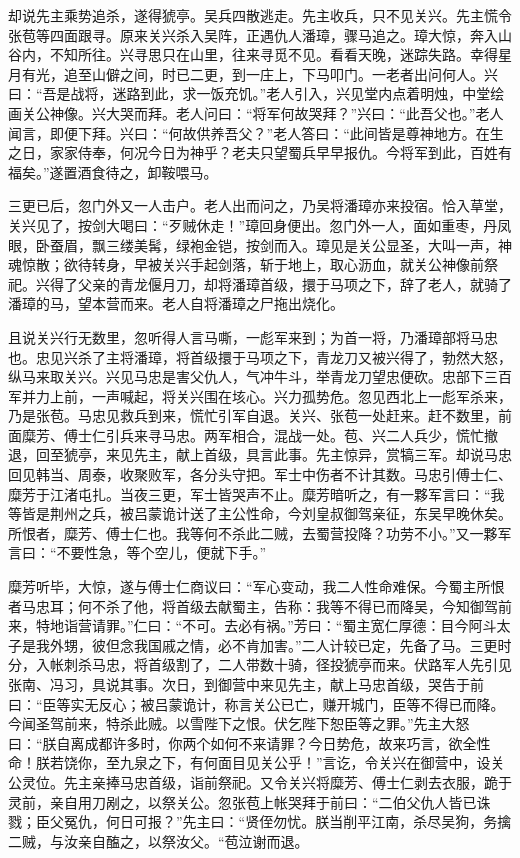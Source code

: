 却说先主乘势追杀，遂得猇亭。吴兵四散逃走。先主收兵，只不见关兴。先主慌令张苞等四面跟寻。原来关兴杀入吴阵，正遇仇人潘璋，骤马追之。璋大惊，奔入山谷内，不知所往。兴寻思只在山里，往来寻觅不见。看看天晚，迷踪失路。幸得星月有光，追至山僻之间，时已二更，到一庄上，下马叩门。一老者出问何人。兴曰：“吾是战将，迷路到此，求一饭充饥。”老人引入，兴见堂内点着明烛，中堂绘画关公神像。兴大哭而拜。老人问曰：“将军何故哭拜？”兴曰：“此吾父也。”老人闻言，即便下拜。兴曰：“何故供养吾父？”老人答曰：“此间皆是尊神地方。在生之日，家家侍奉，何况今日为神乎？老夫只望蜀兵早早报仇。今将军到此，百姓有福矣。”遂置酒食待之，卸鞍喂马。

三更已后，忽门外又一人击户。老人出而问之，乃吴将潘璋亦来投宿。恰入草堂，关兴见了，按剑大喝曰：“歹贼休走！”璋回身便出。忽门外一人，面如重枣，丹凤眼，卧蚕眉，飘三缕美髯，绿袍金铠，按剑而入。璋见是关公显圣，大叫一声，神魂惊散；欲待转身，早被关兴手起剑落，斩于地上，取心沥血，就关公神像前祭祀。兴得了父亲的青龙偃月刀，却将潘璋首级，擐于马项之下，辞了老人，就骑了潘璋的马，望本营而来。老人自将潘璋之尸拖出烧化。

且说关兴行无数里，忽听得人言马嘶，一彪军来到；为首一将，乃潘璋部将马忠也。忠见兴杀了主将潘璋，将首级擐于马项之下，青龙刀又被兴得了，勃然大怒，纵马来取关兴。兴见马忠是害父仇人，气冲牛斗，举青龙刀望忠便砍。忠部下三百军并力上前，一声喊起，将关兴围在垓心。兴力孤势危。忽见西北上一彪军杀来，乃是张苞。马忠见救兵到来，慌忙引军自退。关兴、张苞一处赶来。赶不数里，前面糜芳、傅士仁引兵来寻马忠。两军相合，混战一处。苞、兴二人兵少，慌忙撤退，回至猇亭，来见先主，献上首级，具言此事。先主惊异，赏犒三军。却说马忠回见韩当、周泰，收聚败军，各分头守把。军士中伤者不计其数。马忠引傅士仁、糜芳于江渚屯扎。当夜三更，军士皆哭声不止。糜芳暗听之，有一夥军言曰：“我等皆是荆州之兵，被吕蒙诡计送了主公性命，今刘皇叔御驾亲征，东吴早晚休矣。所恨者，糜芳、傅士仁也。我等何不杀此二贼，去蜀营投降？功劳不小。”又一夥军言曰：“不要性急，等个空儿，便就下手。”

糜芳听毕，大惊，遂与傅士仁商议曰：“军心变动，我二人性命难保。今蜀主所恨者马忠耳；何不杀了他，将首级去献蜀主，告称：我等不得已而降吴，今知御驾前来，特地诣营请罪。”仁曰：“不可。去必有祸。”芳曰：“蜀主宽仁厚德：目今阿斗太子是我外甥，彼但念我国戚之情，必不肯加害。”二人计较已定，先备了马。三更时分，入帐刺杀马忠，将首级割了，二人带数十骑，径投猇亭而来。伏路军人先引见张南、冯习，具说其事。次日，到御营中来见先主，献上马忠首级，哭告于前曰：“臣等实无反心；被吕蒙诡计，称言关公已亡，赚开城门，臣等不得已而降。今闻圣驾前来，特杀此贼。以雪陛下之恨。伏乞陛下恕臣等之罪。”先主大怒曰：“朕自离成都许多时，你两个如何不来请罪？今日势危，故来巧言，欲全性命！朕若饶你，至九泉之下，有何面目见关公乎！”言讫，令关兴在御营中，设关公灵位。先主亲捧马忠首级，诣前祭祀。又令关兴将糜芳、傅士仁剥去衣服，跪于灵前，亲自用刀剐之，以祭关公。忽张苞上帐哭拜于前曰：“二伯父仇人皆已诛戮；臣父冤仇，何日可报？”先主曰：“贤侄勿忧。朕当削平江南，杀尽吴狗，务擒二贼，与汝亲自醢之，以祭汝父。“苞泣谢而退。

